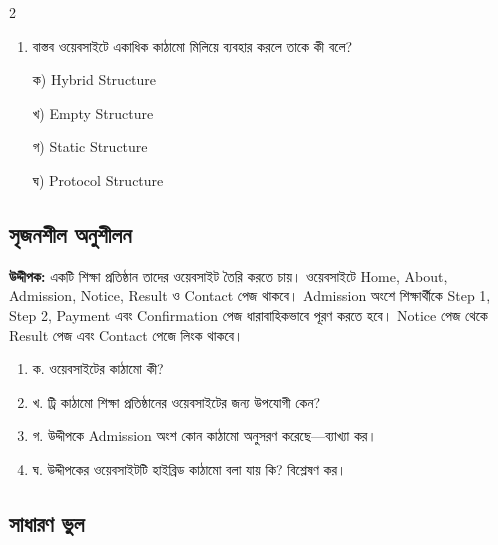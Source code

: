 \begin{multicols}{2}
\begin{enumerate}[leftmargin=*,itemsep=5pt]
\item \begin{minipage}[t]{\linewidth}\vspace{0pt}
বাস্তব ওয়েবসাইটে একাধিক কাঠামো মিলিয়ে ব্যবহার করলে তাকে কী বলে?
\par ক) Hybrid Structure
\par খ) Empty Structure
\par গ) Static Structure
\par ঘ) Protocol Structure\\
\end{minipage}
\end{enumerate}
\end{multicols}

\subsection{সৃজনশীল অনুশীলন}

\begin{practicebox}
\textbf{উদ্দীপক:} একটি শিক্ষা প্রতিষ্ঠান তাদের ওয়েবসাইট তৈরি করতে চায়। ওয়েবসাইটে Home, About, Admission, Notice, Result ও Contact পেজ থাকবে। Admission অংশে শিক্ষার্থীকে Step 1, Step 2, Payment এবং Confirmation পেজ ধারাবাহিকভাবে পূরণ করতে হবে। Notice পেজ থেকে Result পেজ এবং Contact পেজে লিংক থাকবে।

\begin{enumerate}
\item ক. ওয়েবসাইটের কাঠামো কী?
\item খ. ট্রি কাঠামো শিক্ষা প্রতিষ্ঠানের ওয়েবসাইটের জন্য উপযোগী কেন?
\item গ. উদ্দীপকে Admission অংশ কোন কাঠামো অনুসরণ করেছে—ব্যাখ্যা কর।
\item ঘ. উদ্দীপকের ওয়েবসাইটটি হাইব্রিড কাঠামো বলা যায় কি? বিশ্লেষণ কর।
\end{enumerate}
\end{practicebox}



\subsection{সাধারণ ভুল}

